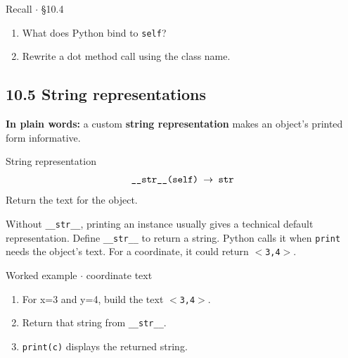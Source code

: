 \documentclass[11pt]{article}
\begin{document}
\begin{keepsection}
\begin{recallbox}{Recall \ensuremath{\cdot} §10.4}
\begin{enumerate}
\item What does Python bind to \texttt{self}?
\item Rewrite a dot method call using the class name.
\end{enumerate}

\end{recallbox}
\end{keepsection}

\begin{keepsection}
\section{10.5 String representations}

\begin{plainbox}\textbf{In plain words:} a custom \textbf{string representation} makes an object’s printed form informative.\end{plainbox}

\begin{equationcard}{String representation}
\[ \begin{gathered} \texttt{\_\_str\_\_(self) \ensuremath{\to} str} \end{gathered} \]
{\small Return the text for the object.}
\end{equationcard}

Without \texttt{\_\_str\_\_}, printing an instance usually gives a technical default representation. Define \texttt{\_\_str\_\_} to return a string. Python calls it when \texttt{print} needs the object’s text. For a coordinate, it could return \texttt{\ensuremath{<}3,4\ensuremath{>}}.

\begin{workedbox}{Worked example \ensuremath{\cdot} coordinate text}
\begin{enumerate}
\item For x=3 and y=4, build the text \texttt{\ensuremath{<}3,4\ensuremath{>}}.
\item Return that string from \texttt{\_\_str\_\_}.
\item \texttt{print(c)} displays the returned string.
\end{enumerate}
\end{workedbox}


\end{keepsection}
\end{document}
